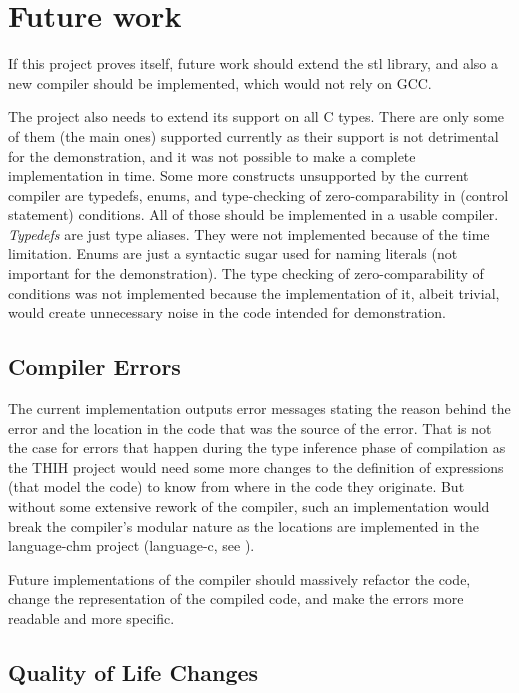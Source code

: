 \section{Future work}

If this project proves itself, future work should extend the stl library, and also a new compiler should be implemented, which would not rely on GCC.

The project also needs to extend its support on all C types. There are only some of them (the main ones) supported currently as their support is not detrimental for the demonstration, and it was not possible to make a complete implementation in time. Some more constructs unsupported by the current compiler are typedefs, enums, and type-checking of zero-comparability in (control statement) conditions. All of those should be implemented in a usable compiler. \emph{Typedefs} are just type aliases. They were not implemented because of the time limitation. Enums are just a syntactic sugar used for naming literals (not important for the demonstration). The type checking of zero-comparability of conditions was not implemented because the implementation of it, albeit trivial, would create unnecessary noise in the code intended for demonstration.

\subsection{Compiler Errors}

The current implementation outputs error messages stating the reason behind the error and the location in the code that was the source of the error. That is not the case for errors that happen during the type inference phase of compilation as the THIH \cite{jones1999typing} project would need some more changes to the definition of expressions (that model the code) to know from where in the code they originate. But without some extensive rework of the compiler, such an implementation would break the compiler's modular nature as the locations are implemented in the language-chm project (language-c, see \cite{visq2018language-c}).

Future implementations of the compiler should massively refactor the code, change the representation of the compiled code, and make the errors more readable and more specific.

\subsection{Quality of Life Changes}

